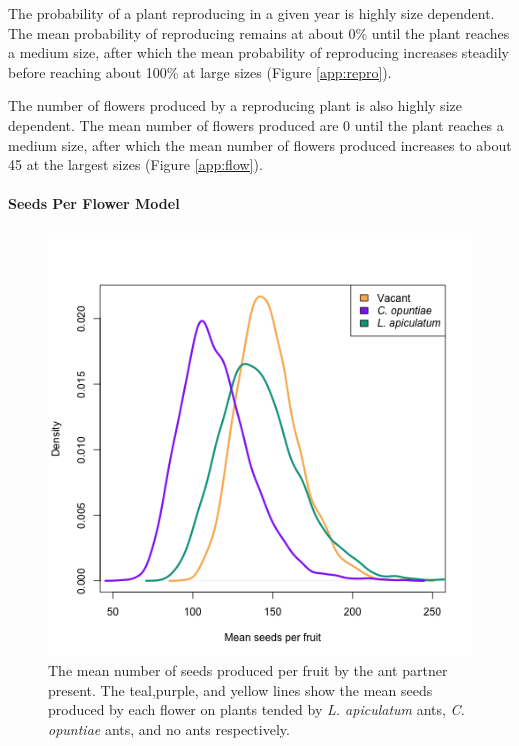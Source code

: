 \documentclass[11pt]{article}
\begin{document}
The probability of a plant reproducing in a given year is highly size dependent. 
The mean probability of reproducing remains at about 0\% until the plant reaches a medium size, after which the mean probability of reproducing increases steadily before reaching about 100\% at large sizes (Figure \ref{app:repro}). 

The number of flowers produced by a reproducing plant is also highly size dependent. 
The mean number of flowers produced are 0 until the plant reaches a medium size, after which the mean number of flowers produced increases to about 45 at the largest sizes (Figure \ref{app:flow}).




\paragraph{Seeds Per Flower Model}

\renewcommand{\thefigure}{A\arabic{figure}}

\begin{figure}
	\includegraphics[width=0.91\linewidth]{Figures/Seeds_Per_Fruit.png}
	\caption{The mean number of seeds produced per fruit by the ant partner present. The teal,purple, and yellow lines show the mean seeds produced by each flower on plants tended by \textit{L. apiculatum} ants, \textit{C. opuntiae} ants, and no ants respectively. }
	\label{app:seeds}
\end{figure}
\end{document}
